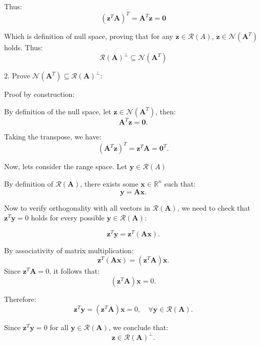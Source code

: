 \documentclass[12pt]{article}
\newcommand{\bvec}[1]{\mathbf{#1}} %
\begin{document}
\begin{itemize}
    Thus:
    \[
    (\mathbf{z}^T \mathbf{A})^T = \mathbf{A}^T \mathbf{z} = \mathbf{0} 
    \]
    
    Which is definition of null space, 
    proving that for any $\bvec{z} \in \mathcal{R}(A)$, \( \mathbf{z} \in \mathcal{N}(\mathbf{A}^T) \) holds.
    Thus:
    \[
    \mathcal{R}(\mathbf{A})^\perp \subseteq \mathcal{N}(\mathbf{A}^T)
    \]
    \vspace{\baselineskip}

    2. Prove \( \mathcal{N}(\mathbf{A}^T) \subseteq \mathcal{R}(\mathbf{A})^\perp \):

 \vspace{\baselineskip}
    
    Proof by construction:
    
    By definition of the null space, let \( \mathbf{z} \in \mathcal{N}(\mathbf{A}^T) \), then:
    \[
    \mathbf{A}^T \mathbf{z} = \mathbf{0}.
    \]
    
    Taking the transpose, we have:
    \[
    (\mathbf{A}^T \mathbf{z})^T = \mathbf{z}^T \mathbf{A} = \bvec{0}^T.
    \]
   
    
    Now, lets consider the range space. 
    Let $\bvec{y} \in \mathcal{R}(A)$
    
    By definition of \( \mathcal{R}(\mathbf{A}) \), there exists some \( \mathbf{x} \in \mathbb{R}^n \) such that:
    \[
    \mathbf{y} = \mathbf{A} \mathbf{x}.
    \]
    
     Now to verify orthogonality with all vectors in \( \mathcal{R}(\mathbf{A}) \), we need
     to check that \( \mathbf{z}^T \mathbf{y} = 0 \) holds for every possible \( \mathbf{y} \in \mathcal{R}(\mathbf{A}) \):
     
    \[
    \mathbf{z}^T \mathbf{y} = \mathbf{z}^T (\mathbf{A} \mathbf{x}).
    \]
    
    By associativity of matrix multiplication:
    \[
    \mathbf{z}^T (\mathbf{A} \mathbf{x}) = (\mathbf{z}^T \mathbf{A}) \mathbf{x}.
    \]
    Since \( \mathbf{z}^T \mathbf{A} = 0 \), it follows that:
    \[
    (\mathbf{z}^T \mathbf{A}) \mathbf{x} = 0.
    \]
    
    Therefore:
    \[
    \mathbf{z}^T \mathbf{y} =(\mathbf{z}^T \mathbf{A})\bvec{x}= 0, \quad \forall \mathbf{y} \in \mathcal{R}(\mathbf{A}).
    \]
    
    Since \( \mathbf{z}^T \mathbf{y} = 0 \) for all \( \mathbf{y} \in \mathcal{R}(\mathbf{A}) \), we conclude that:
    \[
    \mathbf{z} \in \mathcal{R}(\mathbf{A})^\perp.
    \]
    


\end{itemize}
\end{document}
